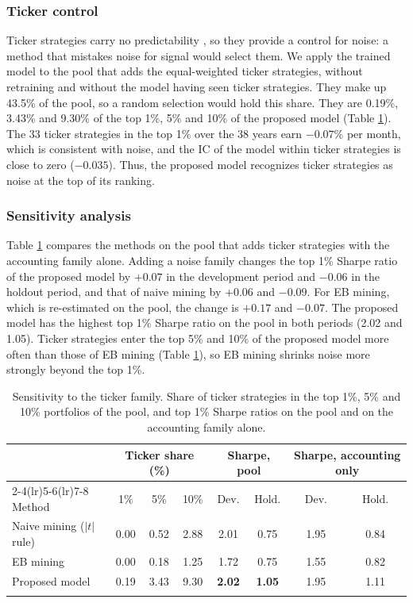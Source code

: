 \documentclass[pdflatex,sn-mathphys-num]{sn-jnl}%
\theoremstyle{thmstyleone}%
\theoremstyle{thmstyletwo}%
\theoremstyle{thmstylethree}%
\begin{document}
\subsubsection{Ticker control}
Ticker strategies carry no predictability \cite{chen2025highthroughputassetpricing}, so they provide a control for noise: a method that mistakes noise for signal would select them. We apply the trained model to the pool that adds the equal-weighted ticker strategies, without retraining and without the model having seen ticker strategies. They make up 43.5\% of the pool, so a random selection would hold this share. They are 0.19\%, 3.43\% and 9.30\% of the top 1\%, 5\% and 10\% of the proposed model (Table \ref{tab:ticker}). The 33 ticker strategies in the top 1\% over the 38 years earn $-0.07\%$ per month, which is consistent with noise, and the IC of the model within ticker strategies is close to zero ($-0.035$). Thus, the proposed model recognizes ticker strategies as noise at the top of its ranking.

\subsubsection{Sensitivity analysis}
Table \ref{tab:ticker} compares the methods on the pool that adds ticker strategies with the accounting family alone. Adding a noise family changes the top 1\% Sharpe ratio of the proposed model by $+0.07$ in the development period and $-0.06$ in the holdout period, and that of naive mining by $+0.06$ and $-0.09$. For EB mining, which is re-estimated on the pool, the change is $+0.17$ and $-0.07$. The proposed model has the highest top 1\% Sharpe ratio on the pool in both periods (2.02 and 1.05). Ticker strategies enter the top 5\% and 10\% of the proposed model more often than those of EB mining (Table \ref{tab:ticker}), so EB mining shrinks noise more strongly beyond the top 1\%.

\begin{table}[h]
\caption{Sensitivity to the ticker family. Share of ticker strategies in the top 1\%, 5\% and 10\% portfolios of the pool, and top 1\% Sharpe ratios on the pool and on the accounting family alone.}\label{tab:ticker}%
\small
\begin{tabular}{@{}lccccccc@{}}
\toprule
 & \multicolumn{3}{c}{Ticker share (\%)} & \multicolumn{2}{c}{Sharpe, pool} & \multicolumn{2}{c}{Sharpe, accounting only} \\
\cmidrule(lr){2-4}\cmidrule(lr){5-6}\cmidrule(lr){7-8}
Method & 1\% & 5\% & 10\% & Dev. & Hold. & Dev. & Hold. \\
\midrule
Naive mining ($|t|$ rule) & 0.00 & 0.52 & 2.88 & 2.01 & 0.75 & 1.95 & 0.84 \\
EB mining & 0.00 & 0.18 & 1.25 & 1.72 & 0.75 & 1.55 & 0.82 \\
Proposed model & 0.19 & 3.43 & 9.30 & \textbf{2.02} & \textbf{1.05} & 1.95 & 1.11 \\
\botrule
\end{tabular}
\end{table}
\end{document}
